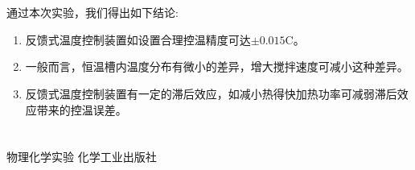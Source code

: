 ﻿\documentclass[10.5pt]{article}
\begin{document}
\section{\textbf{}}

通过本次实验，我们得出如下结论:
\begin{enumerate}
\item 反馈式温度控制装置如设置合理控温精度可达$\pm0.015$\degree C。
\item 一般而言，恒温槽内温度分布有微小的差异，增大搅拌速度可减小这种差异。
\item 反馈式温度控制装置有一定的滞后效应，如减小热得快加热功率可减弱滞后效应带来的控温误差。
\end{enumerate}

\section{\textbf{}}
\begin{thebibliography}{}
物理化学实验 \quad 化学工业出版社
\end{thebibliography}
\end{document}
